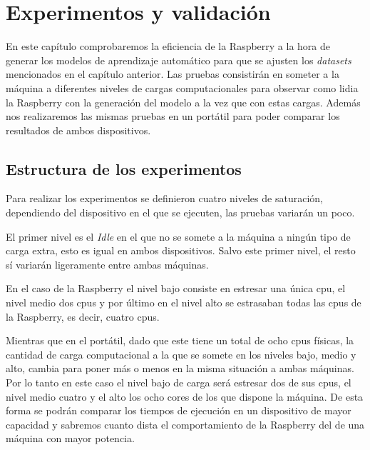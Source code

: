 \documentclass[a4paper, 12pt]{book}
\begin{document}
\cleardoublepage


\chapter{Experimentos y validación}
\label{chap:experimentos}

En este capítulo comprobaremos la eficiencia de la Raspberry a la hora de generar los modelos de aprendizaje automático para que se ajusten los \textit{datasets} mencionados en el capítulo anterior. Las pruebas consistirán en someter a la máquina a diferentes niveles de cargas computacionales para observar como lidia la Raspberry con la generación del modelo a la vez que con estas cargas.
Además nos realizaremos las mismas pruebas en un portátil para poder comparar los resultados de ambos dispositivos.

\section{Estructura de los experimentos}
\label{sec:estructura_experimentos}

Para realizar los experimentos se definieron cuatro niveles de saturación, dependiendo del dispositivo en el que se ejecuten, las pruebas variarán un poco. 

El primer nivel es el \textit{Idle} en el que no se somete a la máquina a ningún tipo de carga extra, esto es igual en ambos dispositivos. Salvo este primer nivel, el resto sí variarán ligeramente entre ambas máquinas.

En el caso de la Raspberry el nivel bajo consiste en estresar una única cpu, el nivel medio dos cpus y por último en el nivel alto se estrasaban todas las cpus de la Raspberry, es decir, cuatro cpus. 

Mientras que en el portátil, dado que este tiene un total de ocho cpus físicas, la cantidad de carga computacional a la que se somete en los niveles bajo, medio y alto, cambia para poner más o menos en la misma situación a ambas máquinas. Por lo tanto en este caso el nivel bajo de carga será estresar dos de sus cpus, el nivel medio cuatro y el alto los ocho cores de los que dispone la máquina. De esta forma se podrán comparar los tiempos de ejecución en un dispositivo de mayor capacidad y sabremos cuanto dista el comportamiento de la Raspberry del de una máquina con mayor potencia.
\end{document}
